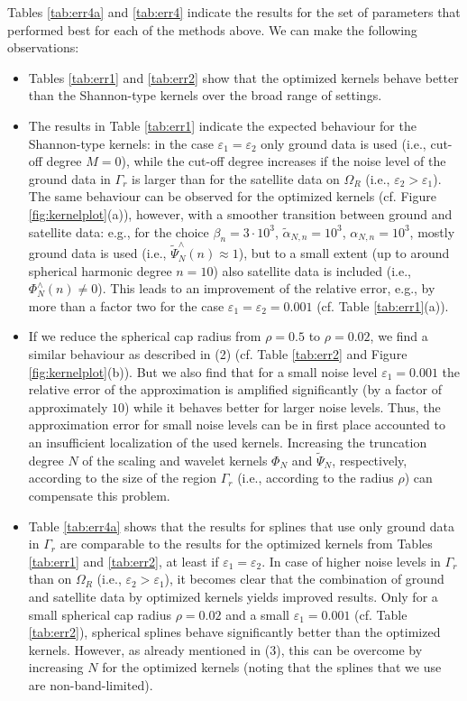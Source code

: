 \documentclass[a4paper, 10pt]{article}
\numberwithin{equation}{section}
\theoremstyle{definition}
\newcommand{\eps}{\ensuremath{\varepsilon}}
\begin{document}
Tables \ref{tab:err4a} and \ref{tab:err4} indicate the results for the set of parameters that performed best for each of the methods above. We can make the following observations:
\begin{itemize}
\item[(1)] Tables  \ref{tab:err1} and \ref{tab:err2} show that the optimized kernels behave better than the Shannon-type kernels over the broad range of settings.
\item[(2)] The results in Table \ref{tab:err1} indicate the expected behaviour for the Shannon-type kernels: in the case $\varepsilon_1=\varepsilon_2$ only ground data is used (i.e., cut-off degree $M=0$), while the cut-off degree increases if the noise level of the ground data in $\Gamma_r$ is larger than for the satellite data on $\Omega_R$ (i.e., $\varepsilon_2>\varepsilon_1$). The same behaviour can be observed for the optimized kernels (cf. Figure \ref{fig:kernelplot}(a)), however, with a smoother transition between ground and satellite data: e.g., for the choice $\beta_n=3\cdot 10^3$, $\tilde{\alpha}_{N,n}=10^3$, ${\alpha}_{N,n}=10^3$, mostly ground data is used (i.e., $\tilde{\Psi}_N^\wedge(n)\approx 1$), but to a small extent (up to around spherical harmonic degree $n=10$) also satellite data is included (i.e., ${\Phi}_N^\wedge(n)\not=0$). This leads to an improvement of the relative error, e.g., by more than a factor two for the case $\eps_1=\eps_2=0.001$ (cf. Table \ref{tab:err1}(a)).
\item[(3)] If we reduce the spherical cap radius from $\rho=0.5$ to $\rho=0.02$, we find a similar behaviour as described in (2) (cf. Table \ref{tab:err2} and Figure \ref{fig:kernelplot}(b)). But we also find that for a small noise level $\varepsilon_1=0.001$ the relative error of the approximation is amplified significantly (by a factor of approximately $10$) while it behaves better for larger noise levels. Thus, the approximation error for small noise levels can be in first place accounted to an insufficient localization of the used kernels. Increasing the truncation degree $N$ of the scaling and wavelet kernels $\Phi_N$ and $\tilde{\Psi}_N$, respectively, according to the size of the region $\Gamma_r$ (i.e., according to the radius $\rho$) can compensate this problem.
\item[(4)] Table \ref{tab:err4a} shows that the results for splines that use only ground data in $\Gamma_r$ are comparable to the results for the optimized kernels from Tables \ref{tab:err1} and \ref{tab:err2}, at least if $\eps_1=\eps_2$. In case of higher noise levels in $\Gamma_r$ than on $\Omega_R$ (i.e., $\eps_2>\eps_1$), it becomes clear that the combination of ground and satellite data by optimized kernels yields improved results. Only for a small spherical cap radius $\rho=0.02$ and a small $\eps_1=0.001$ (cf. Table \ref{tab:err2}), spherical splines behave significantly better than the optimized kernels. However, as already mentioned in (3), this can be overcome by increasing $N$ for the optimized kernels (noting that the splines that we use are non-band-limited).

\end{itemize}
\end{document}
